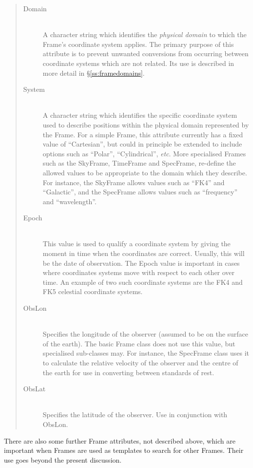 \documentclass[twoside,11pt]{article}
\newcommand{\secref}[1]{\S\ref{#1}}
\newcommand{\secref}[1]{\ref{#1}}
\begin{document}
\begin{quote}
\begin{description}
\item[Domain]\mbox{}\\
A character string which identifies the {\em{physical domain}} to
which the Frame's coordinate system applies. The primary purpose of
this attribute is to prevent unwanted conversions from occurring
between coordinate systems which are not related. Its use is described
in more detail in \secref{ss:framedomains}.

\item[System]\mbox{}\\
A character string which identifies the specific coordinate system used
to describe positions within the physical domain represented by the Frame.
For a simple Frame, this attribute currently has a fixed value of
``Cartesian'', but could in principle be extended to include options such
as ``Polar'', ``Cylindrical'', {\em{etc}}. More specialised Frames such
as the SkyFrame, TimeFrame  and SpecFrame, re-define the allowed values to be
appropriate to the domain which they describe. For instance, the SkyFrame
allows values such as ``FK4'' and ``Galactic'', and the SpecFrame allows
values such as ``frequency'' and ``wavelength''.

\item[Epoch]\mbox{}\\
This value is used to qualify a coordinate system by giving the moment in
time when the coordinates are correct. Usually, this will be the date of
observation. The Epoch value is important in cases where coordinates
systems move with respect to each other over time. An example of two such
coordinate systems are the FK4 and FK5 celestial coordinate systems.

\item[ObsLon]\mbox{}\\
Specifies the longitude of the observer (assumed to be on the surface of
the earth). The basic Frame class does not use this value, but
specialised sub-classes may. For instance, the SpecFrame class uses it to
calculate the relative velocity of the observer and the centre of the
earth for use in converting between standards of rest.

\item[ObsLat]\mbox{}\\
Specifies the latitude of the observer. Use in conjunction with ObsLon.

\end{description}
\end{quote}

There are also some further Frame attributes, not described above,
which are important when Frames are used as templates to search for
other Frames. Their use goes beyond the present discussion.
\end{document}
